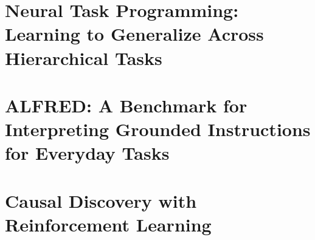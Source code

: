 \documentclass[../main.tex]{subfiles}
\begin{document}
\section{Neural Task Programming: Learning to Generalize Across Hierarchical Tasks}


\section{ALFRED: A Benchmark for Interpreting Grounded Instructions for Everyday Tasks}


\section{Causal Discovery with Reinforcement Learning}

\end{document}
